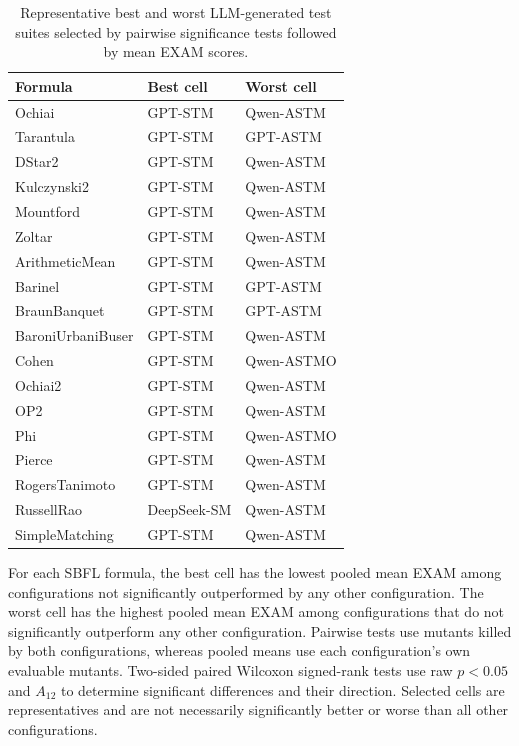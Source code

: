 \begin{table}[t]
\centering
\caption{Representative best and worst LLM-generated test suites selected by pairwise significance tests followed by mean EXAM scores.}
\label{tab:rq3bw-selection}
\begin{tabular}{lll}
\hline
Formula & Best cell & Worst cell \\
\hline
Ochiai & GPT-STM & Qwen-ASTM \\
Tarantula & GPT-STM & GPT-ASTM \\
DStar2 & GPT-STM & Qwen-ASTM \\
Kulczynski2 & GPT-STM & Qwen-ASTM \\
Mountford & GPT-STM & Qwen-ASTM \\
Zoltar & GPT-STM & Qwen-ASTM \\
ArithmeticMean & GPT-STM & Qwen-ASTM \\
Barinel & GPT-STM & GPT-ASTM \\
BraunBanquet & GPT-STM & GPT-ASTM \\
BaroniUrbaniBuser & GPT-STM & Qwen-ASTM \\
Cohen & GPT-STM & Qwen-ASTMO \\
Ochiai2 & GPT-STM & Qwen-ASTM \\
OP2 & GPT-STM & Qwen-ASTM \\
Phi & GPT-STM & Qwen-ASTMO \\
Pierce & GPT-STM & Qwen-ASTM \\
RogersTanimoto & GPT-STM & Qwen-ASTM \\
RussellRao & DeepSeek-SM & Qwen-ASTM \\
SimpleMatching & GPT-STM & Qwen-ASTM \\
\hline
\end{tabular}
\par\smallskip
\begin{minipage}{\linewidth}\footnotesize For each SBFL formula, the best cell has the lowest pooled mean EXAM among configurations not significantly outperformed by any other configuration. The worst cell has the highest pooled mean EXAM among configurations that do not significantly outperform any other configuration. Pairwise tests use mutants killed by both configurations, whereas pooled means use each configuration's own evaluable mutants. Two-sided paired Wilcoxon signed-rank tests use raw $p<0.05$ and $A_{12}$ to determine significant differences and their direction. Selected cells are representatives and are not necessarily significantly better or worse than all other configurations.
\end{minipage}
\end{table}
